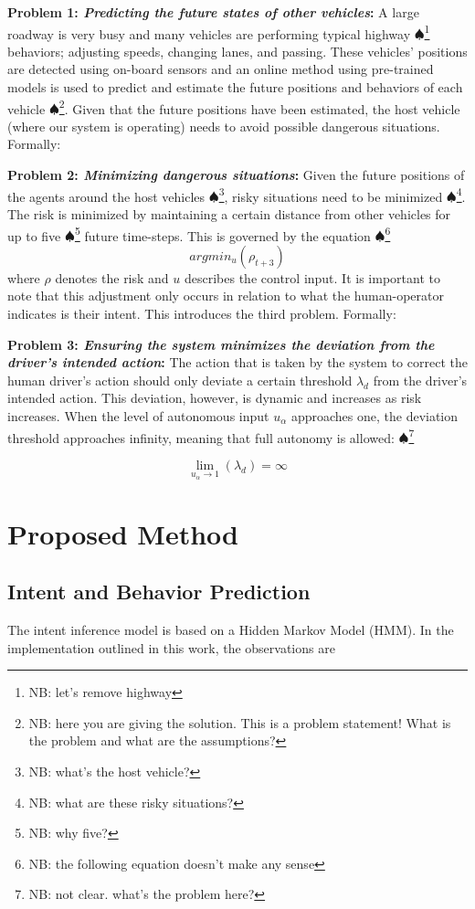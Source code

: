 \documentclass[conference]{IEEEtran}
\newcommand\NB[1]{$\spadesuit$\footnote{NB: #1}}
\begin{document}
    \textbf{Problem 1: \textit{Predicting the future states of other vehicles}:}
	A large roadway is very busy and many vehicles are performing typical highway \NB{let's remove highway} behaviors; adjusting speeds, changing lanes, and passing. These vehicles' positions are detected using on-board sensors and an online method using pre-trained models is used to predict and estimate the future positions and behaviors of each vehicle \NB{here you are giving the solution. This is a problem statement! What is the problem and what are the assumptions? }. Given that the future positions have been estimated, the host vehicle (where our system is operating) needs to avoid possible dangerous situations. Formally:
	
	\textbf{Problem 2: \textit{Minimizing dangerous situations}:} Given the future positions of the agents around the host vehicles \NB{what's the host vehicle?}, risky situations need to be minimized \NB{what are these risky situations?}. The risk is minimized by maintaining a certain distance from other vehicles for up to five \NB{why five?} future time-steps. This is governed by the equation \NB{the following equation doesn't make any sense}
	\begin{equation}
	argmin_{u}(\rho_{t+3})    
	\end{equation}
	where $\rho$ denotes the risk and $u$ describes the control input. It is important to note that this adjustment only occurs in relation to what the human-operator indicates is their intent. This introduces the third problem. Formally:

	\textbf{Problem 3: \textit{Ensuring the system minimizes the deviation from the driver's intended action}:} The action that is taken by the system to correct the human driver's action should only deviate a certain threshold $\lambda_{d}$ from the driver's intended action. This deviation, however, is dynamic and increases as risk increases. When the level of autonomous input $u_{\alpha}$ approaches one, the deviation threshold approaches infinity, meaning that full autonomy is allowed: \NB{not clear. what's the problem here?}
	
	\begin{equation}
	    \lim_{u_{\alpha}\xrightarrow{}1}(\lambda_{d}) = \infty
	\end{equation}
	
\section{Proposed Method}
\subsection{Intent and Behavior Prediction}
The intent inference model is based on a Hidden Markov Model (HMM). In the implementation outlined in this work, the observations are\\
\end{document}
